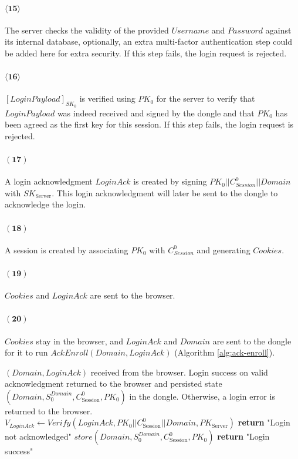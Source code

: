 \paragraph{$\boldsymbol{\langle15\rangle}$} The server checks the validity of the provided $Username$ and $Password$ against its internal database, optionally, an extra multi-factor authentication step could be added here for extra security. If this step fails, the login request is rejected.
\paragraph{$\boldsymbol{\langle16\rangle}$} $[LoginPayload]_{SK_0}$ is verified using $PK_0$ for the server to verify that $LoginPayload$ was indeed received and signed by the dongle and that $PK_0$ has been agreed as the first key for this session. If this step fails, the login request is rejected.
\paragraph{$\boldsymbol{(17)}$} A login acknowledgment $LoginAck$ is created by signing $PK_0||C_{Session}^0||Domain$ with $SK_\text{Server}$. This login acknowledgment will later be sent to the dongle to acknowledge the login.
\paragraph{$\boldsymbol{(18)}$} A session is created by associating $PK_0$ with $C_{Session}^0$ and generating $Cookies$. 
\paragraph{$\boldsymbol{(19)}$} $Cookies$ and $LoginAck$ are sent to the browser.
\paragraph{$\boldsymbol{(20)}$} $Cookies$ stay in the browser, and $LoginAck$ and $Domain$ are sent to the dongle for it to run $AckEnroll(Domain, LoginAck)$ (Algorithm \ref{alg:ack-enroll}).
\begin{algorithm}[ht!]
\caption{$AckEnroll(Domain, LoginAck)$}
\begin{algorithmic}[1]
    \Require $(Domain, LoginAck)$ received from the browser.
    \Ensure  Login success on valid acknowledgment returned to the browser and persisted state
             $(Domain, S_0^{Domain}, C^0_{\text{Session}}, PK_0)$ in the dongle. Otherwise, a login error is returned to the browser.
     \State $V_{LoginAck} \leftarrow Verify(LoginAck, PK_0||C^0_{\text{Session}}||Domain, PK_{\text{Server}})$
        \State \textbf{return} "Login not acknowledged"
    \EndIf
    \State $store(Domain, S_0^{Domain}, C^0_{\text{Session}}, PK_0)$
    \State \textbf{return} "Login success"
\end{algorithmic}
\label{alg:ack-enroll}
\end{algorithm}
